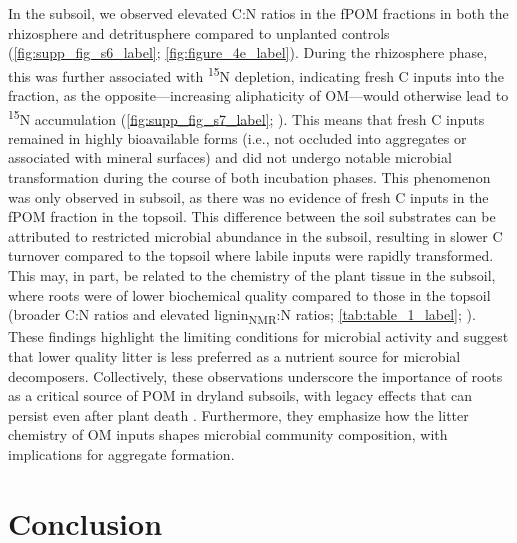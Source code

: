 In the subsoil, we observed elevated C:N ratios in the fPOM fractions in both the rhizosphere and detritusphere compared to unplanted controls (\cref{fig:supp_fig_s6_label}; \cref{fig:figure_4e_label}). During the rhizosphere phase, this was further associated with \textsuperscript{15}N depletion, indicating fresh C inputs into the fraction, as the opposite---increasing aliphaticity of OM---would otherwise lead to \textsuperscript{15}N accumulation (\cref{fig:supp_fig_s7_label}; \citealp{Kramer2003}). This means that fresh C inputs remained in highly bioavailable forms (i.e., not occluded into aggregates or associated with mineral surfaces) and did not undergo notable microbial transformation during the course of both incubation phases. This phenomenon was only observed in subsoil, as there was no evidence of fresh C inputs in the fPOM fraction in the topsoil. This difference between the soil substrates can be attributed to restricted microbial abundance in the subsoil, resulting in slower C turnover compared to the topsoil where labile inputs were rapidly transformed. This may, in part, be related to the chemistry of the plant tissue in the subsoil, where roots were of lower biochemical quality compared to those in the topsoil (broader C:N ratios and elevated lignin\textsubscript{NMR}:N ratios; \cref{tab:table_1_label}; \citealp{Walela2014}). These findings highlight the limiting conditions for microbial activity and suggest that lower quality litter is less preferred as a nutrient source for microbial decomposers. Collectively, these observations underscore the importance of roots as a critical source of POM in dryland subsoils, with legacy effects that can persist even after plant death \citep{Angst2016}. Furthermore, they emphasize how the litter chemistry of OM inputs shapes microbial community composition, with implications for aggregate formation.

\section{Conclusion}

